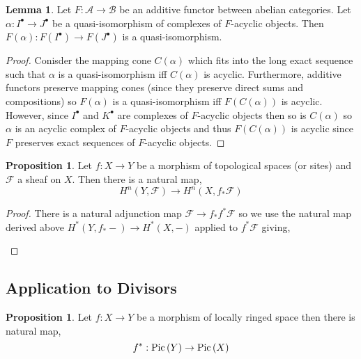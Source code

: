 \documentclass[12pt]{extarticle}
\theoremstyle{definition}
\newtheorem{lemma}[theorem]{Lemma}
\newtheorem{proposition}[theorem]{Proposition}
\newcommand{\F}{\mathcal{F}}
\begin{document}
\begin{lemma}
Let $F : \mathcal{A} \to \mathcal{B}$ be an additive functor between abelian categories. Let $\alpha : I^\bullet \to J^\bullet$ be a quasi-isomorphism of complexes of $F$-acyclic objects. Then $F(\alpha) : F(I^\bullet) \to F(J^\bullet)$ is a quasi-isomorphism. 
\end{lemma}

\begin{proof}
Conisder the mapping cone $C(\alpha)$ which fits into the long exact sequence such that $\alpha$ is a quasi-isomorphism iff $C(\alpha)$ is acyclic. Furthermore, additive functors preserve mapping cones (since they preserve direct sums and compositions) so $F(\alpha)$ is a quasi-isomorphism iff $F(C(\alpha))$ is acyclic. However, since $I^\bullet$ and $K^\bullet$ are complexes of $F$-acyclic objects then so is $C(\alpha)$ so $\alpha$ is an acyclic complex of $F$-acyclic objects and thus $F(C(\alpha))$ is acyclic since $F$ preserves exact sequences of $F$-acyclic objects. 
\end{proof}

\begin{proposition}
Let $f : X \to Y$ be a morphism of topological spaces (or sites) and $\F$ a sheaf on $X$. Then there is a natural map,
\[ H^n(Y, \F) \to H^n(X, f_* \F) \]
\end{proposition}

\begin{proof}
There is a natural adjunction map $\F \to f_* f^* \F$ so we use the natural map derived above $H^*(Y, f_* -) \to H^*(X, - )$ applied to $f^* \F$ giving,
\begin{center}
\end{center}
\end{proof}


\subsection{Application to Divisors}

\begin{proposition}
Let $f : X \to Y$ be a morphism of locally ringed space then there is natural map,
\[ f^* : \mathrm{Pic}\left( Y \right) \to \mathrm{Pic}\left( X \right) \]
\end{proposition}
\end{document}
